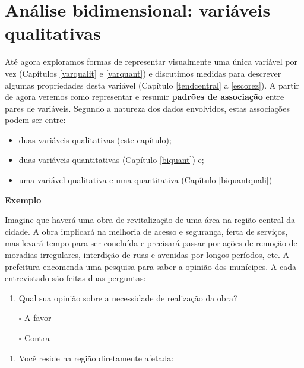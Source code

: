 \documentclass[
]{book}
\providecommand{\tightlist}{%
  \setlength{\itemsep}{0pt}\setlength{\parskip}{0pt}}
\begin{document}
\hypertarget{biquali}{%
\chapter{Análise bidimensional: variáveis qualitativas}\label{biquali}}

Até agora exploramos formas de representar visualmente uma única variável por vez (Capítulos \ref{varqualit} e \ref{varquant}) e discutimos medidas para descrever algumas propriedades desta variável (Capítulo \ref{tendcentral} a \ref{escorez}). A partir de agora veremos como representar e resumir \textbf{padrões de associação} entre pares de variáveis. Segundo a natureza dos dados envolvidos, estas associações podem ser entre:

\begin{itemize}
\item
  duas variáveis qualitativas (este capítulo);
\item
  duas variáveis quantitativas (Capítulo \ref{biquant}) e;
\item
  uma variável qualitativa e uma quantitativa (Capítulo \ref{biquantquali})
\end{itemize}

\textbf{Exemplo}

Imagine que haverá uma obra de revitalização de uma área na região central da cidade. A obra implicará na melhoria de acesso e segurança, ferta de serviços, mas levará tempo para ser concluída e precisará passar por ações de remoção de moradias irregulares, interdição de ruas e avenidas por longos períodos, etc. A prefeitura encomenda uma pesquisa para saber a opinião dos munícipes. A cada entrevistado são feitas duas perguntas:

\begin{enumerate}
\def\labelenumi{\arabic{enumi}.}
\tightlist
\item
  Qual sua opinião sobre a necessidade de realização da obra?
\end{enumerate}

\begin{itemize}
\tightlist
\item[$\square$]
  A favor
\item[$\square$]
  Contra
\end{itemize}

\begin{enumerate}
\def\labelenumi{\arabic{enumi}.}
\setcounter{enumi}{1}
\tightlist
\item
  Você reside na região diretamente afetada:
\end{enumerate}
\end{document}

